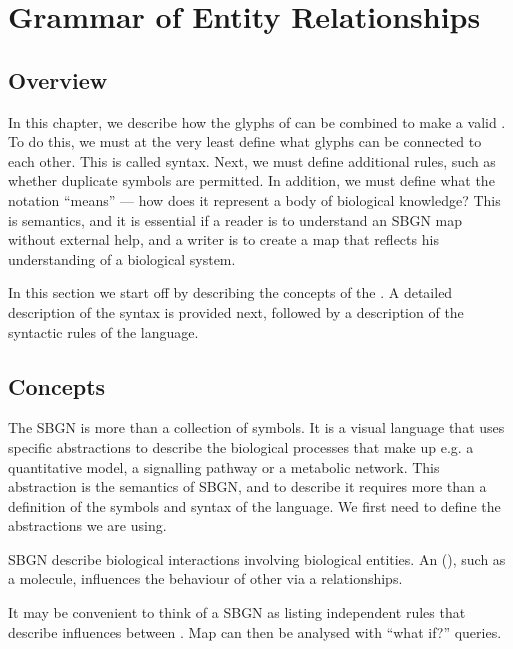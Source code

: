 \chapter{Grammar of Entity Relationships}
\label{chp:grammar}

\section{Overview}

In this chapter, we describe how the glyphs of \SBGNERLone can be combined
to make a valid \ERm{}. To do this, we must at the very least
define what glyphs can be connected to each other. This is called
syntax. Next, we must define additional rules, such as whether duplicate symbols are permitted. In addition, we must define what the notation ``means'' --- how does it represent a body of biological knowledge? This is semantics, and it is essential if a reader is to understand an SBGN map without external help, and a writer is to create a map that reflects his understanding of a biological system.

In this section we start off by describing the concepts of the
\ERl{}. A detailed description of the syntax is provided next,
followed by a description of the syntactic rules of the language.

\section{Concepts}

The SBGN \ERl{} is more than a collection of symbols. It is a
visual language that uses specific abstractions to describe the
biological processes that make up e.g. a quantitative model, a signalling pathway or a metabolic network. This abstraction is the semantics of SBGN, and to describe it requires more than a definition
of the symbols and syntax of the language. We first need to define the
abstractions we are using.

SBGN \ERs{} describe biological interactions involving biological entities. An  (), such as a molecule, influences the behaviour of other  via a relationships. 

It may be convenient to think of a SBGN \ERs{} as listing independent rules that describe influences between . Map can then be analysed with ``what if?'' queries. 





